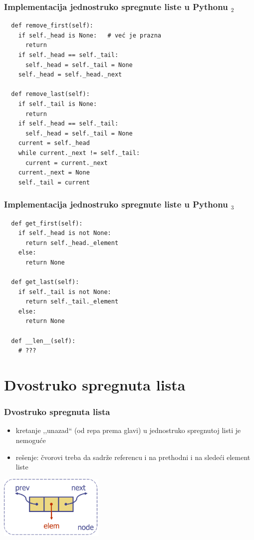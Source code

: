 \documentclass[compress]{beamer}
\begin{document}
\begin{frame}
  \frametitle{Implementacija jednostruko spregnute liste u Pythonu $_2$}
\begin{verbatim}
  def remove_first(self):
    if self._head is None:   # već je prazna
      return
    if self._head == self._tail:
      self._head = self._tail = None
    self._head = self._head._next
    
  def remove_last(self):
    if self._tail is None:
      return
    if self._head == self._tail:
      self._head = self._tail = None
    current = self._head
    while current._next != self._tail:
      current = current._next
    current._next = None
    self._tail = current
\end{verbatim}
\end{frame}

\begin{frame}
  \frametitle{Implementacija jednostruko spregnute liste u Pythonu $_3$}
\begin{verbatim}
  def get_first(self):
    if self._head is not None:
      return self._head._element
    else:
      return None
        
  def get_last(self):
    if self._tail is not None:
      return self._tail._element
    else:
      return None
  
  def __len__(self):
    # ???
\end{verbatim}
\end{frame}

\section[2-Lista]{Dvostruko spregnuta lista}
\begin{frame}[fragile]
  \frametitle{Dvostruko spregnuta lista}
  \begin{itemize}
    \item kretanje ,,unazad`` (od repa prema glavi) u jednostruko spregnutoj listi je nemoguće
    \item rešenje: čvorovi treba da sadrže referencu i na prethodni i na sledeći element liste
  \end{itemize}
  \begin{center}
    \includegraphics[width=5cm]{asp-07-pic06.png}
  \end{center}
\end{frame}
\end{document}
